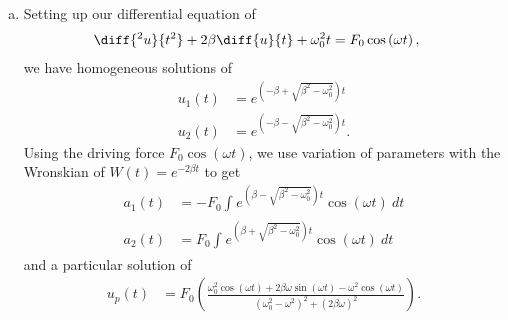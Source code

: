 \documentclass[10pt]{mypackage}
\begin{document}
\begin{solution}[39.13]\hfill
  \begin{enumerate}[(a)]
    \item Setting up our differential equation of
      \begin{align*}
        \diff{^2u}{t^2} + 2\beta \diff{u}{t} + \omega_0^2 t &= F_0\cos\left( \omega t \right),
      \end{align*}
      we have homogeneous solutions of
      \begin{align*}
        u_{1}(t) &= e^{\left( -\beta + \sqrt{\beta^2 - \omega_0^2} \right)t}\\
        u_{2}(t) &= e^{\left( -\beta - \sqrt{\beta^2 - \omega_0^2} \right)t}.
      \end{align*}
      Using the driving force $F_0\cos\left( \omega t \right)$, we use variation of parameters with the Wronskian of $W(t) = e^{-2\beta t}$ to get
      \begin{align*}
        a_1(t) &= -F_0\int_{}^{} e^{\left( \beta - \sqrt{\beta^2 - \omega_0^2} \right)t} \cos\left( \omega t \right)\:dt\\
        a_2(t) &= F_0\int_{}^{} e^{\left( \beta + \sqrt{\beta^2 - \omega_0^2} \right)t}\cos\left( \omega t \right)\:dt
      \end{align*}
      and a particular solution of
      \begin{align*}
        u_p(t) &= F_0\left( \frac{\omega_0^2\cos\left( \omega t \right) + 2\beta\omega\sin\left( \omega t \right) - \omega^2\cos\left( \omega t \right)}{\left( \omega_0^2 - \omega^2 \right)^2 + \left( 2\beta\omega \right)^2} \right).
      \end{align*}
  \end{enumerate}
\end{solution}
\end{document}

